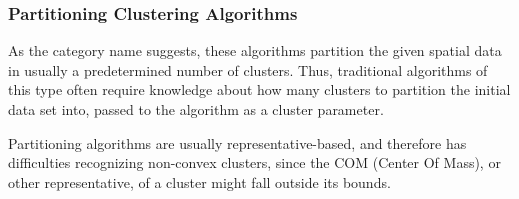 \subsubsection{Partitioning Clustering Algorithms}

As the category name suggests, these algorithms partition the given 
spatial data in usually a predetermined number of clusters. Thus, traditional 
algorithms of this type often require knowledge
about how many clusters to partition the initial data set into, passed to 
the algorithm as a cluster parameter.

Partitioning algorithms are usually representative-based, and therefore
has difficulties recognizing non-convex clusters, since the COM (Center
Of Mass), or other representative, of a cluster might fall outside 
its bounds.


